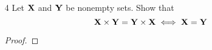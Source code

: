 \documentclass[11pt]{book}
\begin{document}
\begin{enumerate}
\begin{enumerate}
\begin{proof}
          Then $\bigcap_{(\alpha,\beta)} \sf{A}_{\alpha} \cup \sf{B}_{\beta}$ is got by apply Proposition 2.4(iii) again to right side of this equation.
          This method can be apply to the second equation of this proposition.
        \end{proof}
  \item[(iii)]
        $(\bigcap_{\alpha} \sf{A}_{\alpha})^{c} = \bigcup_{\alpha} \sf{A}^{c}_{\alpha}$ \\
        $(\bigcup_{\alpha} \sf{A}_{\alpha})^{c} = \bigcap_{\alpha} \sf{A}^{c}_{\alpha}$ (de Morgan's laws)

        \begin{proof}
          Write your proof here.
        \begin{align*}
        \end{align*}
        \end{proof}
\end{enumerate}

  \item[4] Let $\bf{X}$ and $\bf{Y}$ be nonempty sets. Show that
        $$\bf{X} \times \bf{Y} = \bf{Y} \times \bf{X} \iff \bf{X} = \bf{Y}$$
        \begin{proof}

        \end{proof}
        
\end{enumerate}
\end{document}
